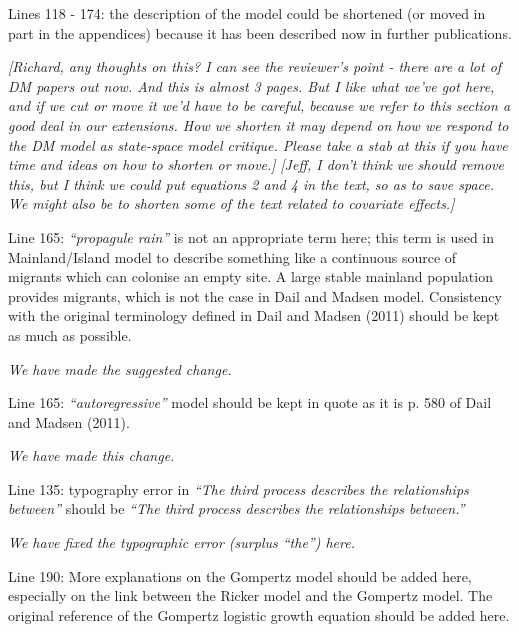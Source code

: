 \documentclass[12pt,english]{article}
\begin{document}
\begin{spacing}{1.9}
\begin{flushleft}
Lines 118 - 174: the description of the model could be shortened (or moved in part in the
appendices) because it has been described now in further publications.

\vspace{0.5cm}
\textit{[Richard, any thoughts on this?  I can see the reviewer's point - there are a lot of DM
papers out now.  And this is almost 3 pages.  But I like what we've got here, and if we cut or
move it we'd have to be careful, because we refer to this section a good deal in our extensions.
How we shorten it may depend on how we respond to the DM model as state-space model critique.
Please take a stab at this if you have time and ideas on how to
shorten or move.]}
\textit{[Jeff, I don't think we should remove this, but I think we
  could put equations 2 and 4 in the text, so as to save space. We
  might also be to shorten some of the text related to covariate
  effects.]}
\vspace{0.5cm}

Line 165: \textit{``propagule rain''} is not an appropriate term here; this term is used in
Mainland/Island model to describe something like a continuous source of migrants which
can colonise an empty site. A large stable mainland population provides migrants, which is
not the case in Dail and Madsen model. Consistency with the original terminology defined in
Dail and Madsen (2011) should be kept as much as possible.

\vspace{0.5cm}
\textit{We have made the suggested change.}
\vspace{0.5cm}

Line 165: \textit{``autoregressive''} model should be kept in quote as it is p. 580 of Dail and Madsen
(2011).

\vspace{0.5cm}
\textit{We have made this change.}
\vspace{0.5cm}

Line 135: typography error in \textit{``The third process describes the relationships between''} should
be \textit{``The third process describes the relationships between.''}

\vspace{0.5cm}
\textit{We have fixed the typographic error (surplus ``the'') here.}
\vspace{0.5cm}

Line 190: More explanations on the Gompertz model should be added here, especially on
the link between the Ricker model and the Gompertz model. The original reference of the
Gompertz logistic growth equation should be added here.


\end{flushleft}
\end{spacing}
\end{document}
